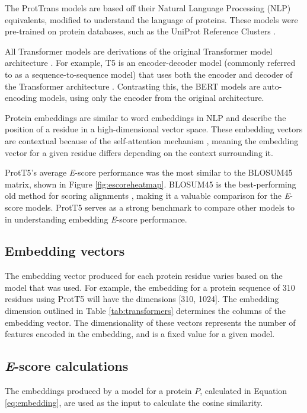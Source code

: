 \documentclass[
	letterpaper, %
	10pt, %
]{journalArticle}
\begin{document}
The ProtTrans models are based off their Natural Language Processing (NLP) equivalents, modified to understand the language of proteins. These models were pre-trained on protein databases, such as the UniProt Reference Clusters \autocite{Suzek:2007}. 

All Transformer models are derivations of the original Transformer model architecture \autocite{Vaswani:2017}. For example, T5 is an encoder-decoder model (commonly referred to as a sequence-to-sequence model) that uses both the encoder and decoder of the Transformer architecture \autocite{Raffel:2020}. Contrasting this, the BERT models \autocite{Devlin:2018, Liu:2019} are auto-encoding models, using only the encoder from the original architecture.

Protein embeddings are similar to word embeddings in NLP and describe the position of a residue in a high-dimensional vector space. These embedding vectors are contextual because of the self-attention mechanism \autocite{Vaswani:2017}, meaning the embedding vector for a given residue differs depending on the context surrounding it.

ProtT5's average \textit{E}-score performance was the most similar to the BLOSUM45 matrix, shown in Figure \ref{fig:escoreheatmap}. BLOSUM45 is the best-performing old method for scoring alignments \autocite{Ashrafzadeh:2023}, making it a valuable comparison for the \textit{E}-score models. ProtT5 serves as a strong benchmark to compare other models to in understanding embedding \textit{E}-score performance.

\subsection{Embedding vectors}
The embedding vector produced for each protein residue varies based on the model that was used. For example, the embedding for a protein sequence of 310 residues using ProtT5 will have the dimensions [310, 1024]. The embedding dimension outlined in Table \ref{tab:transformers} determines the columns of the embedding vector. The dimensionality of these vectors represents the number of features encoded in the embedding, and is a fixed value for a given model.

\subsection{\textit{E}-score calculations}
The embeddings produced by a model for a protein \(P\), calculated in Equation \ref{eq:embedding}, are used as the input to calculate the cosine similarity.
\end{document}
